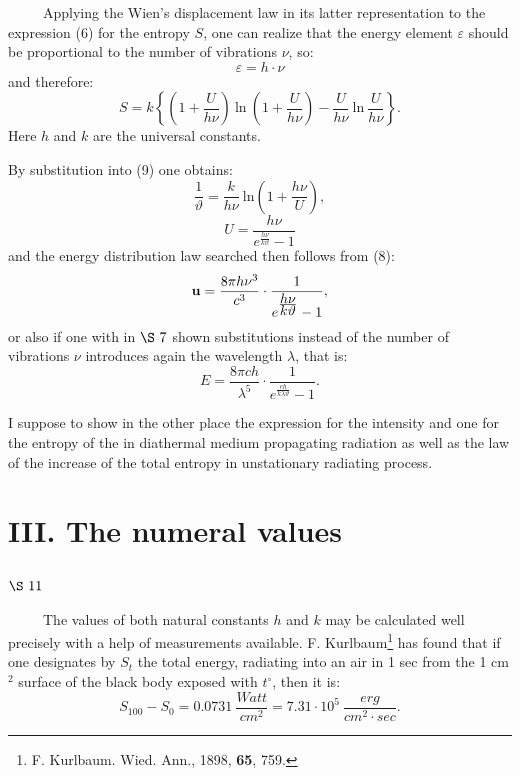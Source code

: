 \documentclass{article}
\begin{document}
~~~~~Applying the Wien's displacement law in its latter representation 
to the expression (6) for the entropy $S$, one can realize that 
the energy element $\varepsilon$ should be proportional 
to the number of vibrations $\nu$, so: 
$$
\varepsilon = h\cdot\nu
$$
and therefore: 
$$
S = k \left\{ \left( 1 + \frac{U}{h \nu} \right)~ \mbox{ln}~ \left( 1 + \frac{U}
{h \nu} \right) - \frac{U}{h \nu}~ \mbox{ln} ~\frac{U}{h \nu} \right\}.
$$
Here $h$ and $k$ are the universal constants. 

By substitution into (9) one obtains: 
\begin{equation}
\frac{1}{\vartheta} = \frac{k}{h \nu}~ \mbox{ln} \left( 1 + \frac{h \nu}{U} 
\right),
\end{equation}
$$
U = \frac{h \nu}{e^{\frac{\displaystyle h \nu}{\displaystyle k \vartheta}} - 1}
$$
and the energy distribution law searched then follows from (8):
\begin{equation}
{\cal \bf u} = \frac{8 \pi h \nu^3}{c^3} \cdot \frac{1}{e^{\frac{\displaystyle h
\nu}{\displaystyle k \vartheta}} - 1},
\end{equation}
or also if one with in $\S~7$ shown substitutions 
instead of the number of vibrations $\nu$ 
introduces again the wavelength $\lambda$, that is: 
\begin{equation}
E = \frac{8 \pi ch}{\lambda^5} \cdot \frac{1}{e^{\frac{\displaystyle ch}
{\displaystyle k \lambda \vartheta}} - 1}.
\end{equation}

I suppose to show in the other place the expression for the intensity 
and one for the entropy of the in diathermal medium propagating radiation 
as well as the law of the increase of the total entropy 
in unstationary radiating process.

\section*{
{\bf III. The numeral values}}
\vspace{0.5cm}
\subsection*{
{\bf $\S~11$}}
\vspace{0.3cm}

~~~~~The values of both natural constants $h$ and $k$ may be calculated 
well precisely with a help of measurements available. 
F. Kurlbaum\footnote{F. Kurlbaum. Wied. Ann., 1898, {\bf 65}, 759.} 
has found that if one designates by $S_t$ the total energy, 
radiating into an air in 1 sec from the 1 cm$^2$ surface of the black body 
exposed with $t^{\circ}$, then it is: 
$$
S_{100} - S_0 = 0.0731 ~ \frac{Watt}{cm^2} = 7.31\cdot10^5 ~ 
\frac{erg}{cm^2 \cdot sec}.
$$
\end{document}
